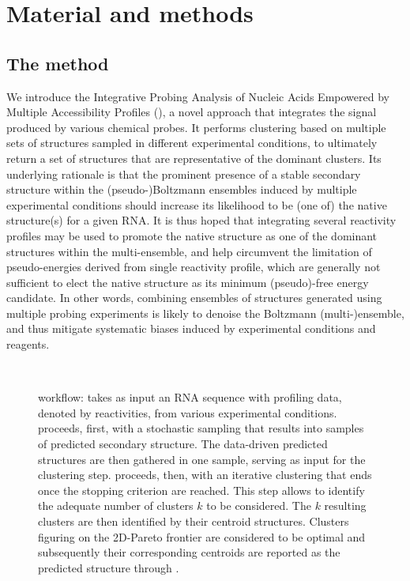 \documentclass[a4,center,fleqn]{NAR}
\begin{document}
\section*{Material and methods}

\subsection*{The \OurTool{} method}
We introduce the Integrative Probing Analysis of Nucleic Acids Empowered by Multiple Accessibility Profiles (\OurTool{}), a novel approach that integrates the signal produced by various chemical probes. It performs clustering based on multiple sets of structures sampled in different experimental conditions, to ultimately return a set of structures that are representative of the dominant clusters. Its underlying rationale is that the prominent presence of a stable secondary structure within the  (pseudo-)Boltzmann ensembles induced by multiple experimental conditions should increase its likelihood to be (one of) the native structure(s) for a given RNA. It is thus hoped that integrating several reactivity profiles may be used to promote the native structure as one of the dominant structures within the multi-ensemble, and help circumvent the limitation of pseudo-energies derived from single reactivity profile, which are generally not sufficient to elect the native structure as its minimum (pseudo)-free energy candidate. In other words, combining ensembles of structures generated using multiple probing experiments is likely to denoise the Boltzmann (multi-)ensemble, and thus mitigate systematic biases induced by experimental conditions and reagents.

\begin{figure}
	{\centering\resizebox{.9\columnwidth}{!}{
			
		}\\}
	
	\caption{\OurTool{} workflow: \OurTool{} takes as input an RNA sequence with profiling data, denoted by reactivities, from various experimental conditions. \OurTool{} proceeds, first,  with a stochastic sampling that results into samples of predicted secondary structure. The data-driven predicted structures are then gathered in one sample, serving as input for the clustering step. \OurTool{} proceeds, then, with an iterative clustering that ends once the stopping criterion are reached. This step allows to identify the adequate number of clusters $k$ to be considered. The $k$ resulting clusters are then identified by their centroid structures. Clusters figuring on the 2D-Pareto frontier are considered to be optimal and subsequently their corresponding centroids are reported as the predicted structure through \OurTool.}\label{fig:approach}
\end{figure}
\end{document}
